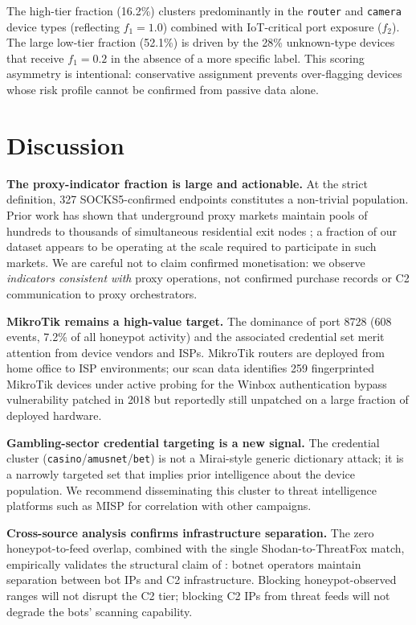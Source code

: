 \documentclass[journal]{IEEEtran}
\begin{document}
The high-tier fraction (16.2\%) clusters predominantly in the \texttt{router}
and \texttt{camera} device types (reflecting $f_1 = 1.0$) combined with
IoT-critical port exposure ($f_2$).
The large low-tier fraction (52.1\%) is driven by the 28\% unknown-type devices
that receive $f_1 = 0.2$ in the absence of a more specific label.
This scoring asymmetry is intentional: conservative assignment prevents
over-flagging devices whose risk profile cannot be confirmed from passive
data alone.


\section{Discussion}
\label{sec:discussion}

\textbf{The proxy-indicator fraction is large and actionable.}
At the strict definition, 327 SOCKS5-confirmed endpoints constitutes a
non-trivial population.
Prior work has shown that underground proxy markets maintain pools of hundreds
to thousands of simultaneous residential exit nodes \cite{mi2019resident,
chiapponi2023inside}; a fraction of our dataset appears to be operating at
the scale required to participate in such markets.
We are careful not to claim confirmed monetisation: we observe
\emph{indicators consistent with} proxy operations, not confirmed purchase
records or C2 communication to proxy orchestrators.

\textbf{MikroTik remains a high-value target.}
The dominance of port 8728 (608 events, 7.2\% of all honeypot activity) and
the associated credential set merit attention from device vendors and ISPs.
MikroTik routers are deployed from home office to ISP environments; our scan
data identifies 259 fingerprinted MikroTik devices under active probing for
the Winbox authentication bypass vulnerability patched in 2018 but reportedly
still unpatched on a large fraction of deployed hardware.

\textbf{Gambling-sector credential targeting is a new signal.}
The credential cluster (\texttt{casino}/\texttt{amusnet}/\texttt{bet}) is not
a Mirai-style generic dictionary attack; it is a narrowly targeted set that
implies prior intelligence about the device population.
We recommend disseminating this cluster to threat intelligence platforms such
as MISP \cite{wagner2016misp} for correlation with other campaigns.

\textbf{Cross-source analysis confirms infrastructure separation.}
The zero honeypot-to-feed overlap, combined with the single Shodan-to-ThreatFox
match, empirically validates the structural claim of \cite{hiesgen2024age}:
botnet operators maintain separation between bot IPs and C2 infrastructure.
Blocking honeypot-observed ranges will not disrupt the C2 tier; blocking
C2 IPs from threat feeds will not degrade the bots' scanning capability.
\end{document}
